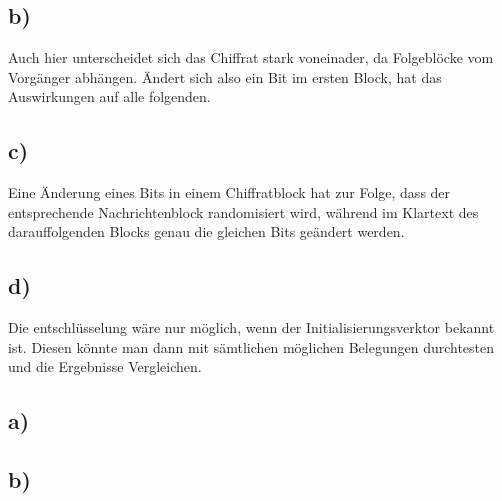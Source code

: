 \documentclass[ngerman]{fbi-aufgabenblatt}
\begin{document}
	\subsection*{b)}
	Auch hier unterscheidet sich das Chiffrat stark voneinader, da Folgeblöcke vom Vorgänger abhängen. Ändert sich also ein Bit im ersten Block, hat das Auswirkungen auf alle folgenden.
	
	\subsection*{c)}
	Eine Änderung eines Bits in einem Chiffratblock hat zur Folge, dass der entsprechende Nachrichtenblock randomisiert wird, während im Klartext des darauffolgenden Blocks genau die gleichen Bits geändert werden.

	\subsection*{d)}
	Die entschlüsselung wäre nur möglich, wenn der Initialisierungsverktor bekannt ist. Diesen könnte man dann mit sämtlichen möglichen Belegungen durchtesten und die Ergebnisse Vergleichen.
	
	
	
	
	\subsection*{a)}
	
	\subsection*{b)}
	
		
	
\end{document}
